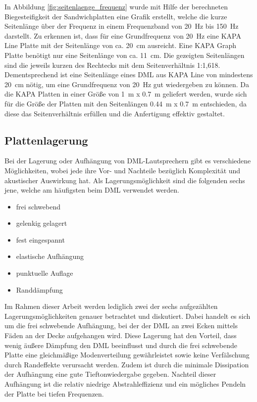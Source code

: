 In Abbildung \ref{fig:seitenlaenge_frequenz} wurde mit Hilfe der berechneten Biegesteifigkeit der Sandwichplatten eine Grafik erstellt, welche die kurze Seitenlänge über der Frequenz in einem Frequenzband von \SI{20}{\hertz} bis \SI{150}{\hertz} darstellt. Zu erkennen ist, dass für eine Grundfrequenz von \SI{20}{\hertz} eine KAPA Line Platte mit der Seitenlänge von ca. \SI{20}{\centi\meter} ausreicht. Eine KAPA Graph Platte benötigt nur eine Seitenlänge von ca. \SI{11}{\centi\meter}. Die gezeigten Seitenlängen sind die jeweils kurzen des Rechtecks mit dem Seitenverhältnis 1:1,618.
Dementsprechend ist eine Seitenlänge eines DML aus KAPA Line von mindestens \SI{20}{\centi\meter} nötig, um eine Grundfrequenz von \SI{20}{\hertz} gut wiedergeben zu können. Da die KAPA Platten in einer Größe von \SI{1}{\meter} x \SI{0,7}{\meter} geliefert werden, wurde sich für die Größe der Platten mit den Seitenlängen \SI{0,44}{\meter} x \SI{0,7}{\meter} entschieden, da diese das Seitenverhältnis erfüllen und die Anfertigung effektiv gestaltet. 


\newpage

\subsection{Plattenlagerung}

Bei der Lagerung oder Aufhängung von DML-Lautsprechern gibt es verschiedene Möglichkeiten, wobei jede ihre Vor- und Nachteile bezüglich Komplexität und akustischer Auswirkung hat. Als Lagerungsmöglichkeit sind die folgenden sechs jene, welche am häufigsten beim DML verwendet werden.

\begin{itemize}
    \item frei schwebend
    \item gelenkig gelagert
    \item fest eingespannt
    \item elastische Aufhängung
    \item punktuelle Auflage
    \item Randdämpfung
\end{itemize}

Im Rahmen dieser Arbeit werden lediglich zwei der sechs aufgezählten Lagerungsmöglichkeiten genauer betrachtet und diskutiert. Dabei handelt es sich um die frei schwebende Aufhängung, bei der der DML an zwei Ecken mittels Fäden an der Decke aufgehangen wird. Diese Lagerung hat den Vorteil, dass wenig äußere Dämpfung den DML beeinflusst und durch die frei schwebende Platte eine gleichmäßige Modenverteilung gewährleistet sowie keine Verfälschung durch Randeffekte verursacht werden. Zudem ist durch die minimale Dissipation der Aufhängung eine gute Tieftonwiedergabe gegeben. Nachteil dieser Aufhängung ist die relativ niedrige Abstrahleffizienz und ein mögliches Pendeln der Platte bei tiefen Frequenzen.


